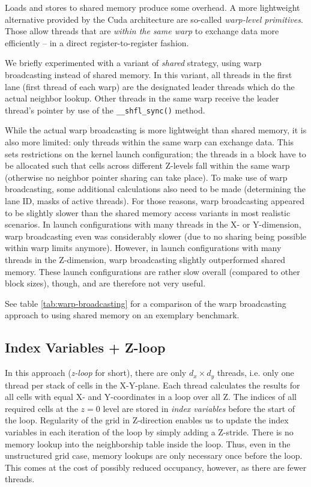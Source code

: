 Loads and stores to shared memory produce some overhead. A more lightweight alternative provided by the Cuda architecture are so-called \emph{warp-level primitives}. Those allow threads that are \emph{within the same warp} to exchange data more efficiently -- in a direct register-to-register fashion.

We briefly experimented with a variant of \emph{shared} strategy, using warp broadcasting instead of shared memory. In this variant, all threads in the first lane (first thread of each warp) are the designated leader threads which do the actual neighbor lookup. Other threads in the same warp receive the leader thread's pointer by use of the \texttt{\_\_shfl\_sync()} method.

While the actual warp broadcasting is more lightweight than shared memory, it is also more limited: only threads within the same warp can exchange data. This sets restrictions on the kernel launch configuration; the threads in a block have to be allocated such that cells across different Z-levels fall within the same warp (otherwise no neighbor pointer sharing can take place). To make use of warp broadcasting, some additional calculations also need to be made (determining the lane ID, masks of active threads). For those reasons, warp broadcasting appeared to be slightly slower than the shared memory access variants in most realistic scenarios. In launch configurations with many threads in the X- or Y-dimension, warp broadcasting even was considerably slower (due to no sharing being possible within warp limits anymore). However, in launch configurations with many threads in the Z-dimension, warp broadcasting slightly outperformed shared memory. These launch configurations are rather slow overall (compared to other block sizes), though, and are therefore not very useful.

See table \ref{tab:warp-broadcasting} for a comparison of the warp broadcasting approach to using shared memory on an exemplary benchmark.

\subsection{Index Variables + Z-loop} In this approach (\emph{z-loop} for short), there are only $d_x\times d_y$ threads, i.e. only one thread per stack of cells in the X-Y-plane. Each thread calculates the results for all cells with equal X- and Y-coordinates in a loop over all Z. The indices of all required cells at the $z=0$ level are stored in \emph{index variables} before the start of the loop. Regularity of the grid in Z-direction enables us to update the index variables in each iteration of the loop by simply adding a Z-stride. There is no memory lookup into the neighborship table inside the loop. Thus, even in the unstructured grid case, memory lookups are only necessary once before the loop. This comes at the cost of possibly reduced occupancy, however, as there are fewer threads.

